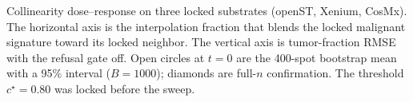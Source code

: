 Collinearity dose--response on three locked substrates (openST, Xenium, CosMx). The horizontal axis is the interpolation fraction that blends the locked malignant signature toward its locked neighbor. The vertical axis is tumor-fraction RMSE with the refusal gate off. Open circles at \(t=0\) are the 400-spot bootstrap mean with a 95\% interval (\(B=1000\)); diamonds are full-\(n\) confirmation. The threshold \(c^\star=0.80\) was locked before the sweep.
